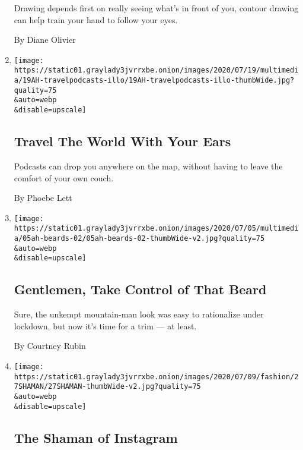 \begin{enumerate}
  Drawing depends first on really seeing what's in front of you, contour
  drawing can help train your hand to follow your eyes.

  By Diane Olivier
\item
  \href{/2020/07/18/at-home/coronavirus-travel-podcasts.html}{}

  \texttt{[image: https://static01.graylady3jvrrxbe.onion/images/2020/07/19/multimedia/19AH-travelpodcasts-illo/19AH-travelpodcasts-illo-thumbWide.jpg?quality=75\\\&auto=webp\\\&disable=upscale]}

  \hypertarget{travel-the-world-with-your-ears}{%
  \subsection{Travel The World With Your
  Ears}\label{travel-the-world-with-your-ears}}

  Podcasts can drop you anywhere on the map, without having to leave the
  comfort of your own couch.

  By Phoebe Lett
\item
  \href{/2020/07/03/at-home/coronavirus-beards.html}{}

  \texttt{[image: https://static01.graylady3jvrrxbe.onion/images/2020/07/05/multimedia/05ah-beards-02/05ah-beards-02-thumbWide-v2.jpg?quality=75\\\&auto=webp\\\&disable=upscale]}

  \hypertarget{gentlemen-take-control-of-that-beard}{%
  \subsection{Gentlemen, Take Control of That
  Beard}\label{gentlemen-take-control-of-that-beard}}

  Sure, the unkempt mountain-man look was easy to rationalize under
  lockdown, but now it's time for a trim --- at least.

  By Courtney Rubin
\item
  \href{/2020/07/03/style/self-care/durek-verrett-instagram-shaman.html}{}

  \texttt{[image: https://static01.graylady3jvrrxbe.onion/images/2020/07/09/fashion/27SHAMAN/27SHAMAN-thumbWide-v2.jpg?quality=75\\\&auto=webp\\\&disable=upscale]}

  \hypertarget{the-shaman-of-instagram}{%
  \subsection{The Shaman of Instagram}\label{the-shaman-of-instagram}}


\end{enumerate}

